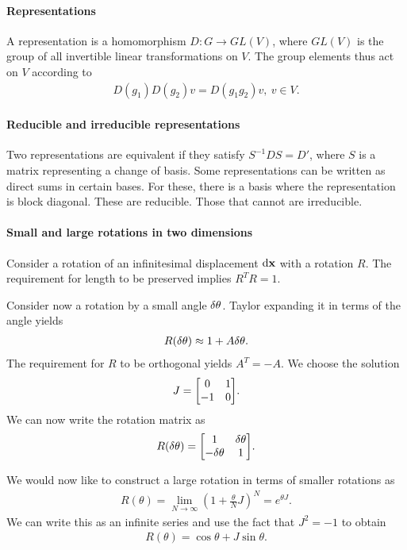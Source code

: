 \paragraph{Representations}
A representation is a homomorphism $D: G\to GL(V)$, where $GL(V)$ is the group of all invertible linear transformations on $V$. The group elements thus act on $V$ according to
\begin{align*}
	D(g_{1})D(g_{2})v = D(g_{1}g_{2})v,\ v\in V.
\end{align*}

\paragraph{Reducible and irreducible representations}
Two representations are equivalent if they satisfy $S^{-1}DS = D'$, where $S$ is a matrix representing a change of basis. Some representations can be written as direct sums in certain bases. For these, there is a basis where the representation is block diagonal. These are reducible. Those that cannot are irreducible.

\paragraph{Small and large rotations in two dimensions}
Consider a rotation of an infinitesimal displacement $\dd{\vb{x}}$ with a rotation $R$. The requirement for length to be preserved implies $R^{T}R = 1$.

Consider now a rotation by a small angle $\delta \theta$. Taylor expanding it in terms of the angle yields
\begin{align*}
	R(\delta \theta) \approx 1 + A\delta \theta.
\end{align*}
The requirement for $R$ to be orthogonal yields $A^{T} = -A$. We choose the solution
\begin{align*}
	J =
	\mqty[
		0  & 1 \\
		-1 & 0
	].
\end{align*}
We can now write the rotation matrix as
\begin{align*}
	R(\var{\theta}) =
	\mqty[
		1             & \var{\theta} \\
		-\var{\theta} & 1
	].
\end{align*}

We would now like to construct a large rotation in terms of smaller rotations as
\begin{align*}
	R(\theta) = \lim\limits_{N\to\infty}\left(1 + \frac{\theta}{N}J\right)^{N} = e^{\theta J}.
\end{align*}
We can write this as an infinite series and use the fact that $J^{2} = -1$ to obtain
\begin{align*}
	R(\theta) = \cos{\theta} + J\sin{\theta}.
\end{align*}

